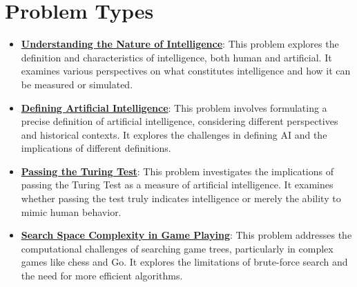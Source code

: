 \documentclass{article}%
\begin{document}
\section{Problem Types}%
\label{sec:ProblemTypes}%
\begin{itemize}[leftmargin=*]%
\item \href{\url{https://purdue.brightspace.com/d2l/common/assets/pdfjs-d2l-dist/1.0.14-legacy/web/viewer.html?file=\%252Fcontent\%252Fenforced\%252F1095467-wl.202510.CS.24300.001\%252F02L2-Intro.pdf\%253Fou\%253D1095467\&lang=en-us\&container=d2l-fileviewer-rendered-pdf\&fullscreen=d2l-fileviewer-rendered-pdf-dialog\&height=667}#page=5}{\textbf{Understanding the Nature of Intelligence}}: This problem explores the definition and characteristics of intelligence, both human and artificial. It examines various perspectives on what constitutes intelligence and how it can be measured or simulated.%
\item \href{\url{https://purdue.brightspace.com/d2l/common/assets/pdfjs-d2l-dist/1.0.14-legacy/web/viewer.html?file=\%252Fcontent\%252Fenforced\%252F1095467-wl.202510.CS.24300.001\%252F02L2-Intro.pdf\%253Fou\%253D1095467\&lang=en-us\&container=d2l-fileviewer-rendered-pdf\&fullscreen=d2l-fileviewer-rendered-pdf-dialog\&height=667}#page=5}{\textbf{Defining Artificial Intelligence}}: This problem involves formulating a precise definition of artificial intelligence, considering different perspectives and historical contexts. It explores the challenges in defining AI and the implications of different definitions.%
\item \href{\url{https://purdue.brightspace.com/d2l/common/assets/pdfjs-d2l-dist/1.0.14-legacy/web/viewer.html?file=\%252Fcontent\%252Fenforced\%252F1095467-wl.202510.CS.24300.001\%252F02L2-Intro.pdf\%253Fou\%253D1095467\&lang=en-us\&container=d2l-fileviewer-rendered-pdf\&fullscreen=d2l-fileviewer-rendered-pdf-dialog\&height=667}#page=6}{\textbf{Passing the Turing Test}}: This problem investigates the implications of passing the Turing Test as a measure of artificial intelligence. It examines whether passing the test truly indicates intelligence or merely the ability to mimic human behavior.%
\item \href{\url{https://purdue.brightspace.com/d2l/common/assets/pdfjs-d2l-dist/1.0.14-legacy/web/viewer.html?file=\%252Fcontent\%252Fenforced\%252F1095467-wl.202510.CS.24300.001\%252F02L2-Intro.pdf\%253Fou\%253D1095467\&lang=en-us\&container=d2l-fileviewer-rendered-pdf\&fullscreen=d2l-fileviewer-rendered-pdf-dialog\&height=667}#page=11}{\textbf{Search Space Complexity in Game Playing}}: This problem addresses the computational challenges of searching game trees, particularly in complex games like chess and Go. It explores the limitations of brute-force search and the need for more efficient algorithms.%

\end{itemize}
\end{document}
